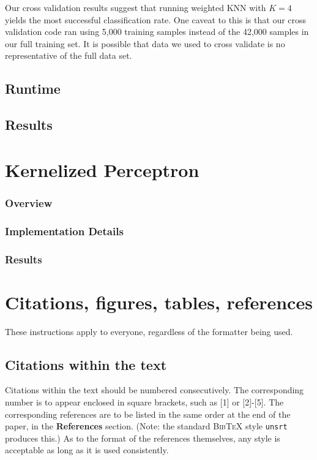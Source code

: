\documentclass{article} %
\begin{document}
Our cross validation results suggest that running weighted KNN with $K = 4$
yields the most successful classification rate. One caveat to this is that our
cross validation code ran using 5,000 training samples instead of the 42,000
samples in our full training set. It is possible that data we used to cross
validate is no representative of the full data set.

\subsection{Runtime}

\subsection{Results}

\section{Kernelized Perceptron}
\subsubsection{Overview}

\subsubsection{Implementation Details}

\subsubsection{Results}


\section{Citations, figures, tables, references}
\label{others}

These instructions apply to everyone, regardless of the formatter being used.

\subsection{Citations within the text}

Citations within the text should be numbered consecutively. The corresponding
number is to appear enclosed in square brackets, such as [1] or [2]-[5]. The
corresponding references are to be listed in the same order at the end of the
paper, in the \textbf{References} section. (Note: the standard
\textsc{Bib\TeX} style \texttt{unsrt} produces this.) As to the format of the
references themselves, any style is acceptable as long as it is used
consistently.
\end{document}
